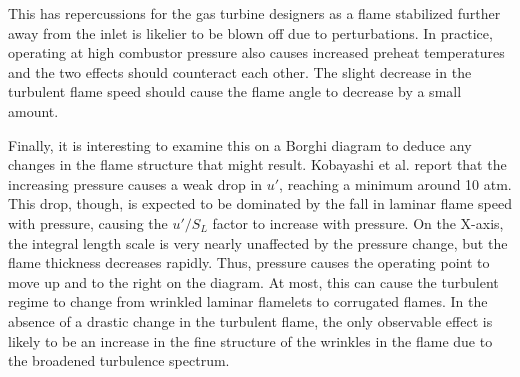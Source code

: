 This has repercussions for the gas turbine designers as a flame stabilized further away from the inlet is likelier to be blown off due to perturbations.
In practice, operating at high combustor pressure also causes increased preheat temperatures and the two effects should counteract each other.
The slight decrease in the turbulent flame speed should cause the flame angle to decrease by a small amount.

Finally, it is interesting to examine this on a Borghi diagram to deduce any changes in the flame structure that might result.
Kobayashi et al.\cite{1997-kobayashi} report that the increasing pressure causes a weak drop in \(u'\), reaching a minimum around 10 atm.
This drop, though, is expected to be dominated by the fall in laminar flame speed with pressure, causing the \(u'/S_L\) factor to increase with pressure.
On the X-axis, the integral length scale is very nearly unaffected by the pressure change, but the flame thickness decreases rapidly.
Thus, pressure causes the operating point to move up and to the right on the diagram.
At most, this can cause the turbulent regime to change from wrinkled laminar flamelets to corrugated flames.
In the absence of a drastic change in the turbulent flame, the only observable effect is likely to be an increase in the fine structure of the wrinkles in the flame due to the broadened turbulence spectrum.


